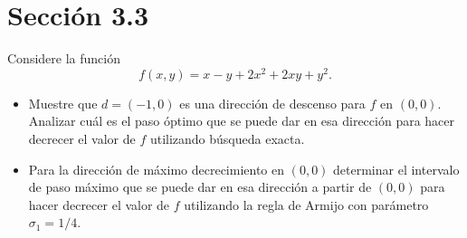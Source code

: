 \documentclass{article}
\newenvironment{theorem}[2][Ejercicio]{\begin{trivlist}
\item[\hskip \labelsep {\bfseries #1}\hskip \labelsep {\bfseries #2.}]}{\end{trivlist}}
\begin{document}
\section*{Sección 3.3}
\begin{theorem}{2}
    Considere la función
    \[
        f(x,y) = x - y + 2x^2 + 2xy + y^2.
    \]

    \begin{itemize}
        \item[(a)] Muestre que \(d = (-1,0)\) es una dirección de descenso para \(f\) en \((0,0)\).
              Analizar cuál es el paso óptimo que se puede dar en esa dirección para hacer decrecer el
              valor de \(f\) utilizando búsqueda exacta.

        \item[(b)] Para la dirección de máximo decrecimiento en \((0,0)\) determinar el intervalo
              de paso máximo que se puede dar en esa dirección a partir de \((0,0)\) para hacer decrecer
              el valor de \(f\) utilizando la regla de Armijo con parámetro \(\sigma_1 = 1/4\).
    \end{itemize}
\end{theorem}
\end{document}
